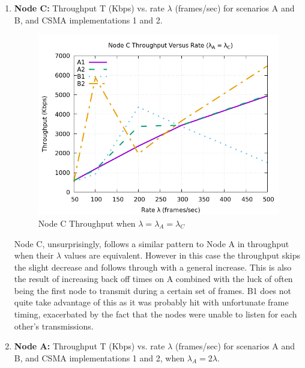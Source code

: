 \documentclass[12pt]{article}
\begin{document}
\begin{enumerate}
        \item {
            {\bf Node C:} Throughput T (Kbps) vs. rate \(\lambda{}\) (frames/sec) for scenarios A and B, and CSMA implementations 1 and 2.
            
            \begin{figure}[!htb]
                \centering
                \includegraphics[width=5in]{1B.png}
                \caption{Node C Throughput when \(\lambda{} = \lambda{}_A = \lambda{}_C\) }
                \label{fig:1B}
            \end{figure}

            Node C, unsurprisingly, follows a similar pattern to Node A in throughput when their \(\lambda{}\) values are equivalent. However in this case the throughput skips the slight decrease and follows through with a general increase. This is also the result of increasing back off times on A combined with the luck of often being the first node to transmit during a certain set of frames. B1 does not quite take advantage of this as it was probably hit with unfortunate frame timing, exacerbated by the fact that the nodes were unable to listen for each other's transmissions.
        }
        
\clearpage
        \item { %
            {\bf Node A:} Throughput T (Kbps) vs. rate \(\lambda{}\) (frames/sec) for scenarios A and B, and CSMA implementations 1 and 2, when \(\lambda{}_A = 2\lambda{}\).
            
}
\end{enumerate}
\end{document}
